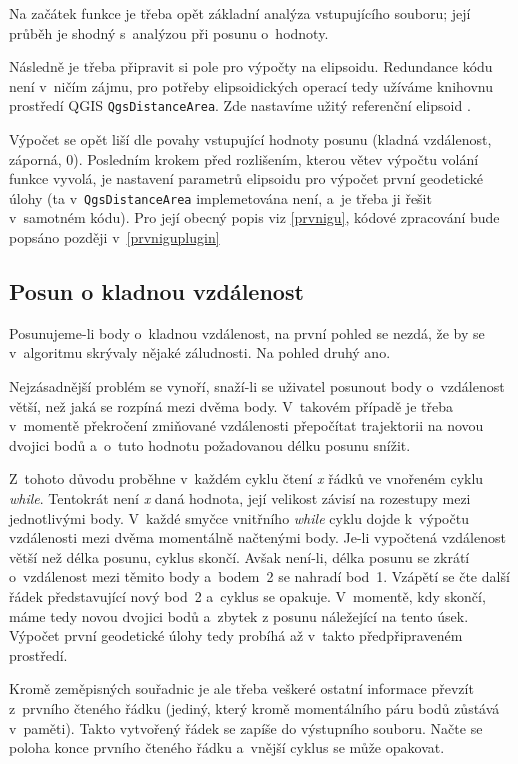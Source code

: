 Na začátek funkce je třeba opět základní analýza vstupujícího souboru; její průběh je shodný
s~analýzou při posunu o~hodnoty. 

Následně je třeba připravit si pole pro výpočty na elipsoidu. Redundance kódu není v~ničím
zájmu, pro potřeby elipsoidických operací tedy užíváme knihovnu
prostředí QGIS {\tt QgsDistanceArea}. Zde nastavíme
užitý referenční elipsoid . 

Výpočet se opět liší dle povahy vstupující hodnoty posunu (kladná vzdálenost,
záporná, 0). Posledním krokem před rozlišením, kterou větev výpočtu volání funkce vyvolá, je nastavení
parametrů elipsoidu pro výpočet první geodetické úlohy (ta v~{\tt QgsDistanceArea} implemetována
není, a~je třeba ji řešit v~samotném kódu). Pro její obecný popis viz
\ref{prvnigu}, kódové zpracování bude popsáno později v~\ref{prvniguplugin} 

\subsection{Posun o kladnou vzdálenost}
\label{kladnavzdalenost}

Posunujeme-li body o~kladnou vzdálenost, na první pohled se nezdá, že by se v~algoritmu skrývaly
nějaké záludnosti. Na pohled druhý ano. 

Nejzásadnější problém se vynoří, snaží-li se uživatel posunout body o~vzdálenost větší, než
jaká se rozpíná mezi dvěma body. V~takovém případě je třeba v~momentě překročení zmiňované
vzdálenosti přepočítat trajektorii na novou dvojici bodů a~o~tuto hodnotu požadovanou
délku posunu snížit. 

Z~tohoto důvodu proběhne v~každém cyklu čtení \textit{x} řádků ve vnořeném cyklu \textit{while}.
Tentokrát není \textit{x} daná hodnota, její velikost závisí na rozestupy mezi jednotlivými body.
V~každé smyčce vnitřního \textit{while} cyklu dojde k~výpočtu vzdálenosti mezi dvěma momentálně
načtenými body. Je-li vypočtená vzdálenost větší než délka posunu, cyklus skončí. 
Avšak není-li, délka posunu se zkrátí o~vzdálenost mezi těmito body a~bodem~2 se nahradí bod~1.
Vzápětí se čte další řádek představující nový bod~2 a~cyklus se opakuje. V~momentě, kdy
skončí, máme tedy novou dvojici bodů a~zbytek z posunu náležející na tento úsek.
Výpočet první geodetické úlohy tedy probíhá až v~takto předpřipraveném prostředí. 

Kromě zeměpisných souřadnic je ale třeba veškeré ostatní informace převzít z~prvního
čteného řádku (jediný, který kromě momentálního páru bodů zůstává v~paměti). Takto vytvořený
řádek se zapíše do výstupního souboru. Načte se poloha konce prvního čteného řádku
a~vnější cyklus se může opakovat. 

